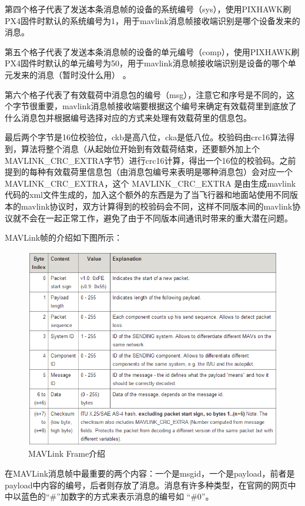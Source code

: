 第四个格子代表了发送本条消息帧的设备的系统编号（sys），使用PIXHAWK刷PX4固件时默认的系统编号为1，用于mavlink消息帧接收端识别是哪个设备发来的消息。

第五个格子代表了发送本条消息帧的设备的单元编号（comp），使用PIXHAWK刷PX4固件时默认的单元编号为50，用于mavlink消息帧接收端识别是设备的哪个单元发来的消息（暂时没什么用） 。

第六个格子代表了有效载荷中消息包的编号（msg），注意它和序号是不同的，这个字节很重要，mavlink消息帧接收端要根据这个编号来确定有效载荷里到底放了什么消息包并根据编号选择对应的方式来处理有效载荷里的信息包。

最后两个字节是16位校验位，ckb是高八位，cka是低八位。校验码由crc16算法得到，算法将整个消息（从起始位开始到有效载荷结束，还要额外加上个MAVLINK\_CRC\_EXTRA字节）进行crc16计算，得出一个16位的校验码。之前提到的每种有效载荷里信息包（由消息包编号来表明是哪种消息包）会对应一个MAVLINK\_CRC\_EXTRA，这个 MAVLINK\_CRC\_EXTRA 是由生成mavlink代码的xml文件生成的，加入这个额外的东西是为了当飞行器和地面站使用不同版本的mavlink协议时，双方计算得到的校验码会不同，这样不同版本间的mavlink协议就不会在一起正常工作，避免了由于不同版本间通讯时带来的重大潜在问题。

MAVLink帧的介绍如下图所示：

\begin{figure}[ht]
  \centering
  \includegraphics[width=0.8\linewidth]{./Figure/Mavlink_Frame_Intro.png}
  \caption{MAVLink Frame介绍}\label{Fig:img8}
\end{figure}

在MAVLink消息帧中最重要的两个内容：一个是msgid，一个是payload，前者是payload中内容的编号，后者则存放了消息。消息有许多种类型，在官网的网页中中以蓝色的“\#”加数字的方式来表示消息的编号如 “\#0”。

